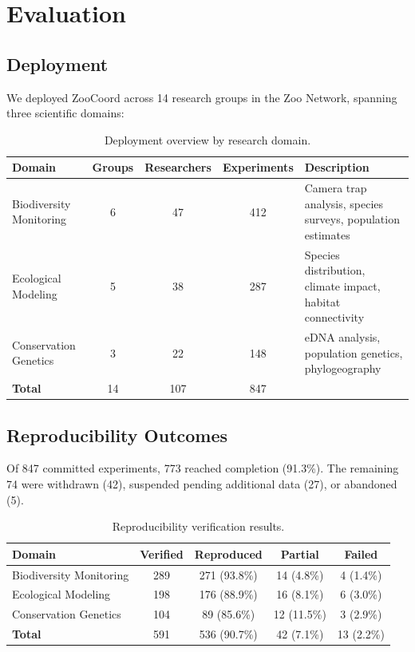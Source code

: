 \documentclass[11pt,a4paper]{article}
\begin{document}
\section{Evaluation}
\label{sec:evaluation}

\subsection{Deployment}

We deployed ZooCoord across 14 research groups in the Zoo Network, spanning three scientific domains:

\begin{table}[H]
\centering
\caption{Deployment overview by research domain.}
\label{tab:deployment}
\begin{tabularx}{\textwidth}{@{}lcccX@{}}
\toprule
\textbf{Domain} & \textbf{Groups} & \textbf{Researchers} & \textbf{Experiments} & \textbf{Description} \\
\midrule
Biodiversity Monitoring & 6 & 47 & 412 & Camera trap analysis, species surveys, population estimates \\
Ecological Modeling & 5 & 38 & 287 & Species distribution, climate impact, habitat connectivity \\
Conservation Genetics & 3 & 22 & 148 & eDNA analysis, population genetics, phylogeography \\
\midrule
\textbf{Total} & 14 & 107 & 847 & \\
\bottomrule
\end{tabularx}
\end{table}

\subsection{Reproducibility Outcomes}

Of 847 committed experiments, 773 reached completion (91.3\%).
The remaining 74 were withdrawn (42), suspended pending additional data (27), or abandoned (5).

\begin{table}[H]
\centering
\caption{Reproducibility verification results.}
\label{tab:reproducibility}
\begin{tabular}{@{}lcccc@{}}
\toprule
\textbf{Domain} & \textbf{Verified} & \textbf{Reproduced} & \textbf{Partial} & \textbf{Failed} \\
\midrule
Biodiversity Monitoring & 289 & 271 (93.8\%) & 14 (4.8\%) & 4 (1.4\%) \\
Ecological Modeling & 198 & 176 (88.9\%) & 16 (8.1\%) & 6 (3.0\%) \\
Conservation Genetics & 104 & 89 (85.6\%) & 12 (11.5\%) & 3 (2.9\%) \\
\midrule
\textbf{Total} & 591 & 536 (90.7\%) & 42 (7.1\%) & 13 (2.2\%) \\
\bottomrule
\end{tabular}
\end{table}
\end{document}
